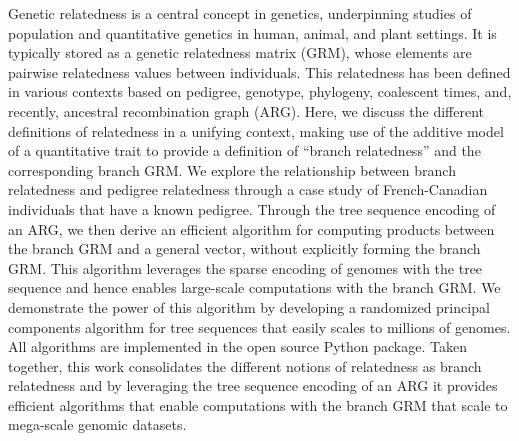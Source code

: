 Genetic relatedness is a central concept in genetics,
underpinning studies of population and quantitative genetics in human, animal, and plant settings.
%
It is typically stored as a genetic relatedness matrix (GRM),
whose elements are pairwise relatedness values between individuals.
%
This relatedness has been defined in various contexts
based on pedigree, genotype, phylogeny, coalescent times,
and, recently, ancestral recombination graph (ARG).
%
%
Here, we discuss the different definitions of relatedness in a unifying context,
making use of the additive model of a quantitative trait
to provide a definition of ``branch relatedness'' and the corresponding branch GRM.
%
We explore the relationship between branch relatedness and pedigree relatedness through a case study of French-Canadian individuals that have a known pedigree.
%
Through the tree sequence encoding of an ARG, we then derive an efficient algorithm for computing products between the branch GRM and a general vector, without explicitly forming the branch GRM.
%
This algorithm leverages the sparse encoding of genomes with the tree sequence and hence enables large-scale computations with the branch GRM.
%
We demonstrate the power of this algorithm by developing
a randomized principal components algorithm for tree sequences
that easily scales to millions of genomes.
%
All algorithms are implemented in the open source \tskit{} Python package.
%
Taken together, this work consolidates the different notions of relatedness as branch relatedness
and by leveraging the tree sequence encoding of an ARG it provides efficient algorithms
that enable computations with the branch GRM that scale to mega-scale genomic datasets.

